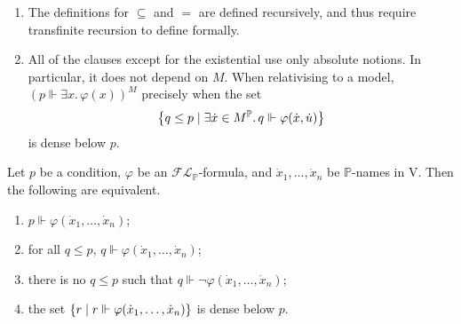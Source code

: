 \begin{remark}
    \begin{enumerate}
        \item The definitions for \( \subseteq \) and \( = \) are defined recursively, and thus require transfinite recursion to define formally.
        \item All of the clauses except for the existential use only absolute notions.
        In particular, it does not depend on \( M \).
        When relativising to a model, \( (p \Vdash \exists x.\, \varphi(x))^M \) precisely when the set
        \[ \qty{q \leq p \mid \exists \dot x \in M^{\mathbb P}.\, q \Vdash \varphi(\dot x, \dot u)} \]
        is dense below \( p \).
    \end{enumerate}
\end{remark}
\begin{proposition}
    Let \( p \) be a condition, \( \varphi \) be an \( \mathcal{FL}_{\mathbb P} \)-formula, and \( \dot x_1, \dots, \dot x_n \) be \( \mathbb P \)-names in \( \mathrm{V} \).
    Then the following are equivalent.
    \begin{enumerate}
        \item \( p \Vdash \varphi(\dot x_1, \dots, \dot x_n) \);
        \item for all \( q \leq p \), \( q \Vdash \varphi(\dot x_1, \dots, \dot x_n) \);
        \item there is no \( q \leq p \) such that \( q \Vdash \neg\varphi(\dot x_1, \dots, \dot x_n) \);
        \item the set \( \qty{r \mid r \Vdash \varphi(\dot x_1, \dots, \dot x_n)} \) is dense below \( p \).
    \end{enumerate}
\end{proposition}
